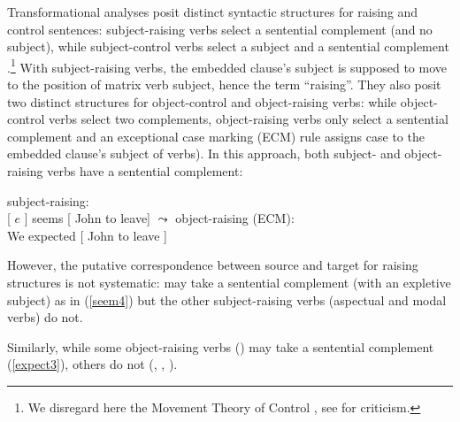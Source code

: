 Transformational analyses posit distinct syntactic structures for raising and control sentences:
subject-raising verbs select a sentential complement (and no subject), while subject-control verbs
select a subject and a sentential complement \parencites[\iaddpages]{Postal1974}[\iaddpages]{Chomsky81a}.\footnote{We disregard here the Movement Theory of Control \citep{Hornstein99a-u}, see  for criticism.}
With subject-raising
verbs, the embedded clause's subject is supposed to move to the position of matrix verb subject,
hence the  term ``raising''. They also posit two distinct structures for object-control and
object-raising verbs: while object-control verbs select two complements, object-raising verbs only
select a sentential complement and an exceptional case marking (ECM) rule assigns case to the
embedded clause's subject of  verbs).
In this approach, both subject- and object-raising verbs have a sentential complement:
	
\eal
\ex subject-raising:\\
{}[ $e$ ] seems [ John to leave] 
$\leadsto$  
\ex object-raising (ECM):\\
We expected [ John to leave ] 	
\zl

\noindent
However, the putative correspondence between source and target for raising structures is not
systematic:  may take a sentential complement (with an expletive subject) as in
(\ref{seem4}) but the other subject-raising verbs (aspectual and modal verbs) do not.

\eal
{}
\zl
 
 \noindent
 Similarly, while some object-raising verbs () may take a sentential complement (\ref{expect3}), others do not (, , ).
 
